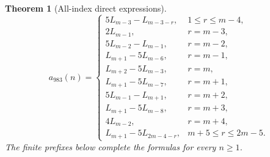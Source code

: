 \documentclass[11pt]{article}
\newtheorem{theorem}{Theorem}[section]
\begin{document}
\begin{theorem}[All-index direct expressions]
\begin{equation}
a_{983}(n)=\begin{cases}
5L_{m-3}-L_{m-3-r},&1\le r\le m-4,\\
2L_{m-1},&r=m-3,\\
5L_{m-2}-L_{m-1},&r=m-2,\\
L_{m+1}-5L_{m-6},&r=m-1,\\
L_{m+2}-5L_{m-3},&r=m,\\
L_{m+1}-5L_{m-7},&r=m+1,\\
5L_{m-1}-L_{m+1},&r=m+2,\\
L_{m+1}-5L_{m-8},&r=m+3,\\
4L_{m-2},&r=m+4,\\
L_{m+1}-5L_{2m-4-r},&m+5\le r\le2m-5.
\end{cases}
\end{equation}
The finite prefixes below complete the formulas for every \(n\ge1\).
\end{theorem}
\end{document}
